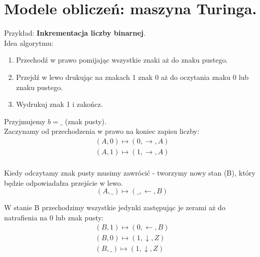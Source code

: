 \documentclass[12pt]{article}
\begin{document}
    \newpage

    \section{Modele obliczeń: maszyna Turinga.}

    Przykład: \textbf{Inkrementacja liczby binarnej}.\\

    \noindent Idea algorytmu:
    \begin{enumerate}
        \item Przechodź w prawo pomijając wszystkie znaki aż do znaku pustego.
        \item Przejdź w lewo drukując na znakach 1 znak 0 aż do oczytania znaku 0 lub znaku pustego.
        \item Wydrukuj znak 1 i zakończ.
    \end{enumerate}
    Przyjmujemy $b = \_$ (znak pusty).\\


    Zaczynamy od przechodzenia w prawo na koniec zapisu liczby:
    \begin{gather*}
        (A, 0) \mapsto (0, \rightarrow, A)\\
        (A, 1) \mapsto (1, \rightarrow, A)\\
    \end{gather*}

    Kiedy odczytamy znak pusty musimy zawrócić - tworzymy nowy stan (B), który będzie odpowiadałza przejście w lewo.
    \[ (A, \_) \mapsto (\_, \leftarrow, B) \]

    W stanie B przechodzimy wszystkie jedynki zastępując je zerami aż do natrafienia na 0 lub znak pusty:
    \begin{gather*}
        (B, 1) \mapsto (0, \leftarrow, B)\\
        (B, 0) \mapsto (1, \downarrow, Z)\\
        (B, \_) \mapsto (1, \downarrow, Z)\\
    \end{gather*}
\end{document}
